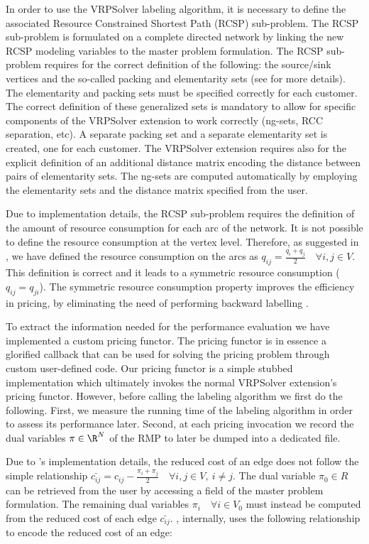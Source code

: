 In order to use the VRPSolver labeling algorithm, it is necessary
to define the associated Resource Constrained Shortest Path (RCSP) sub-problem.
The RCSP sub-problem is formulated on a complete directed network by
linking the new RCSP modeling variables to the master problem formulation.
The RCSP sub-problem requires for the correct definition of the following:
the source/sink vertices and the so-called packing and elementarity sets
(see \cite{pessoa2020generic} for more details).
The elementarity and packing sets must be specified correctly for each customer.
The correct definition of these generalized sets is mandatory to allow for specific
components of the VRPSolver extension to work correctly (ng-sets, RCC separation, etc).
A separate packing set and a separate elementarity set is created, one for each customer.
The VRPSolver extension requires also for the explicit definition of an additional
distance matrix encoding the distance between pairs of elementarity sets.
The ng-sets are computed automatically by employing the elementarity sets
and the distance matrix specified from the user.

Due to implementation details, the RCSP sub-problem requires
the definition of the amount of resource consumption for each arc of the network.
It is not possible to define the resource consumption at the vertex level.
Therefore, as suggested in \textcite{pessoa2020generic}, we have defined the resource consumption
on the arcs as $q_{ij} = \frac{q_{i} + q_{j}}{2} \quad \forall i, j \in V$.
This definition is correct and it leads to a symmetric resource consumption ($q_{ij} = q_{ji}$).
The symmetric resource consumption property improves the efficiency in pricing,
by eliminating the need of performing backward labelling \parencite{pessoa2020generic}.

To extract the information needed for the performance evaluation we have implemented a custom pricing functor.
The pricing functor is in essence a glorified callback that can be used
for solving the pricing problem through custom user-defined code.
Our pricing functor is a simple stubbed implementation which ultimately invokes
the normal VRPSolver extension's pricing functor.
However, before calling the labeling algorithm we first do the following.
First, we measure the running time of the labeling algorithm in order to assess its performance later.
Second, at each pricing invocation we record the dual variables $\pi \in \R^N$ of the RMP
to later be dumped into a dedicated file.

Due to \bapcod's implementation details, the reduced cost of an
edge does not follow the simple relationship $\bar{c_{ij}} = c_{ij} - \frac{\pi_i + \pi_j}{2} \quad \forall i, j \in V,\ i \ne j$.
The dual variable $\pi_0 \in R$ can be retrieved from the user by accessing a field
of the master problem formulation.
The remaining dual variables $\pi_i \quad \forall i \in V_0$ must instead be computed
from the reduced cost of each edge $\bar{c_{ij}}$.
\bapcod, internally, uses the following relationship to encode the reduced cost of an edge:

